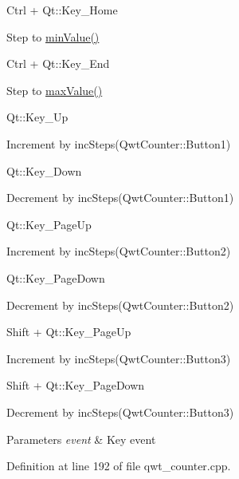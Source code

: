 \begin{DoxyItemize}
\item Ctrl + Qt\-::\-Key\-\_\-\-Home\par
 Step to \hyperlink{class_qwt_counter_a7db2ffbdab4216c83f95fb41c89e8c53}{min\-Value()}
\item Ctrl + Qt\-::\-Key\-\_\-\-End\par
 Step to \hyperlink{class_qwt_counter_a5011e951134590d174a824385e5fb2ae}{max\-Value()}
\item Qt\-::\-Key\-\_\-\-Up\par
 Increment by inc\-Steps(\-Qwt\-Counter\-::\-Button1)
\item Qt\-::\-Key\-\_\-\-Down\par
 Decrement by inc\-Steps(\-Qwt\-Counter\-::\-Button1)
\item Qt\-::\-Key\-\_\-\-Page\-Up\par
 Increment by inc\-Steps(\-Qwt\-Counter\-::\-Button2)
\item Qt\-::\-Key\-\_\-\-Page\-Down\par
 Decrement by inc\-Steps(\-Qwt\-Counter\-::\-Button2)
\item Shift + Qt\-::\-Key\-\_\-\-Page\-Up\par
 Increment by inc\-Steps(\-Qwt\-Counter\-::\-Button3)
\item Shift + Qt\-::\-Key\-\_\-\-Page\-Down\par
 Decrement by inc\-Steps(\-Qwt\-Counter\-::\-Button3)
\end{DoxyItemize}


\begin{DoxyParams}{Parameters}
{\em event} & Key event \\
\hline
\end{DoxyParams}


Definition at line 192 of file qwt\-\_\-counter.\-cpp.

